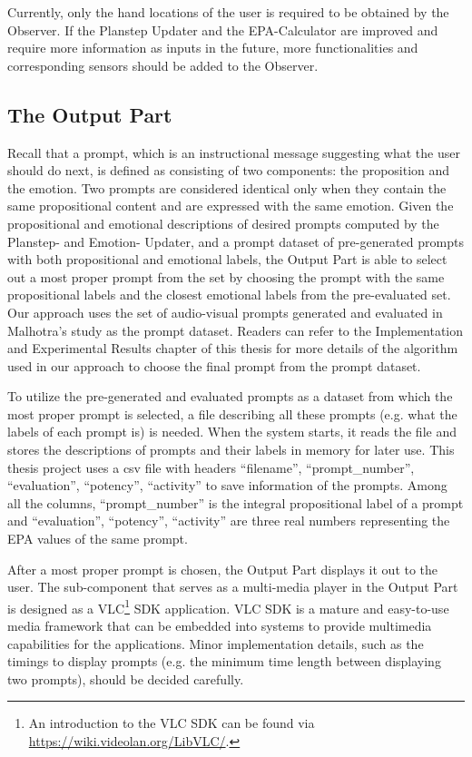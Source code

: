 Currently, only the hand locations of the user is required to be obtained by the Observer. If the Planstep Updater and the EPA-Calculator are improved and require more information as inputs in the future, more functionalities and corresponding sensors should be added to the Observer.

\subsection{The Output Part}

Recall that a prompt, which is an instructional message suggesting what the user should do next, is defined as consisting of two components: the proposition and the emotion. Two prompts are considered identical only when they contain the same propositional content and are expressed with the same emotion. Given the propositional and emotional descriptions of desired prompts computed by the Planstep- and Emotion- Updater, and a prompt dataset of pre-generated prompts with both propositional and emotional labels, the Output Part is able to select out a most proper prompt from the set by choosing the prompt with the same propositional labels and the closest emotional labels from the pre-evaluated set. Our approach uses the set of audio-visual prompts generated and evaluated in Malhotra's study \cite{malhotra2014} as the prompt dataset. Readers can refer to the Implementation and Experimental Results chapter of this thesis for more details of the algorithm used in our approach to choose the final prompt from the prompt dataset.

To utilize the pre-generated and evaluated prompts as a dataset from which the most proper prompt is selected, a file describing all these prompts (e.g. what the labels of each prompt is) is needed. When the system starts, it reads the file and stores the descriptions of prompts and their labels in memory for later use. This thesis project uses a csv file with headers ``filename'', ``prompt\_number'', ``evaluation'', ``potency'', ``activity'' to save information of the prompts. Among all the columns, ``prompt\_number'' is the integral propositional label of a prompt and ``evaluation'', ``potency'', ``activity'' are three real numbers representing the EPA values of the same prompt. 

After a most proper prompt is chosen, the Output Part displays it out to the user. The sub-component that serves as a multi-media player in the Output Part is designed as a VLC\footnote{An introduction to the VLC SDK can be found via \url{https://wiki.videolan.org/LibVLC/}.} SDK application. VLC SDK is a mature and easy-to-use media framework that can be embedded into systems to provide multimedia capabilities for the applications. Minor implementation details, such as the timings to display prompts (e.g. the minimum time length between displaying two prompts), should be decided carefully.

